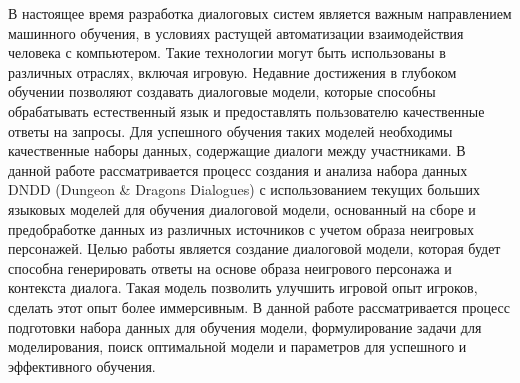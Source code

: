 В настоящее время разработка диалоговых систем является важным направлением машинного обучения, в условиях растущей автоматизации взаимодействия человека с компьютером. Такие технологии могут быть использованы в различных отраслях, включая игровую. Недавние достижения в глубоком обучении позволяют создавать диалоговые модели, которые способны обрабатывать естественный язык и предоставлять пользователю качественные ответы на запросы. Для успешного обучения таких моделей необходимы качественные наборы данных, содержащие диалоги между участниками. В данной работе рассматривается процесс создания и анализа набора данных DNDD (Dungeon \& Dragons Dialogues) с использованием текущих больших языковых моделей для обучения диалоговой модели, основанный на сборе и предобработке данных из различных источников с учетом образа неигровых персонажей. Целью работы является создание диалоговой модели, которая будет способна генерировать ответы на основе образа неигрового персонажа и контекста диалога. Такая модель позволить улучшить игровой опыт игроков, сделать этот опыт более иммерсивным. В данной работе рассматривается процесс подготовки набора данных для обучения модели, формулирование задачи для моделирования, поиск оптимальной модели и параметров для успешного и эффективного обучения.